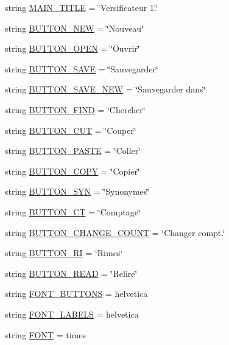 \begin{DoxyCompactItemize}
\item 
string \hyperlink{namespacemainframe_a4d151f87ec600e83da16f6301c0207e3}{M\+A\+I\+N\+\_\+\+T\+I\+T\+L\+E} = \char`\"{}Versificateur 1.\char`\"{}
\item 
string \hyperlink{namespacemainframe_ae4415cd1bd468aab3cb32677fa90a17e}{B\+U\+T\+T\+O\+N\+\_\+\+N\+E\+W} = \char`\"{}Nouveau\char`\"{}
\item 
string \hyperlink{namespacemainframe_a11d78a613c6ebc37d61aa0949a288686}{B\+U\+T\+T\+O\+N\+\_\+\+O\+P\+E\+N} = \char`\"{}Ouvrir\char`\"{}
\item 
string \hyperlink{namespacemainframe_ad0a9c1147be7794e1babbb45c99f4cf5}{B\+U\+T\+T\+O\+N\+\_\+\+S\+A\+V\+E} = \char`\"{}Sauvegarder\char`\"{}
\item 
string \hyperlink{namespacemainframe_a4650b84570a1374524f0b5fc37ca15c9}{B\+U\+T\+T\+O\+N\+\_\+\+S\+A\+V\+E\+\_\+\+N\+E\+W} = \char`\"{}Sauvegarder dans\char`\"{}
\item 
string \hyperlink{namespacemainframe_a0ee34ea1859c695536f5519610b4bac2}{B\+U\+T\+T\+O\+N\+\_\+\+F\+I\+N\+D} = \char`\"{}Chercher\char`\"{}
\item 
string \hyperlink{namespacemainframe_aca439e8911986f6bf15170e358d7c69a}{B\+U\+T\+T\+O\+N\+\_\+\+C\+U\+T} = \char`\"{}Couper\char`\"{}
\item 
string \hyperlink{namespacemainframe_a00380c1a1b21364ba7a90aa3869215b5}{B\+U\+T\+T\+O\+N\+\_\+\+P\+A\+S\+T\+E} = \char`\"{}Coller\char`\"{}
\item 
string \hyperlink{namespacemainframe_a176b68c15c69fa4b7dc161350ee421e4}{B\+U\+T\+T\+O\+N\+\_\+\+C\+O\+P\+Y} = \char`\"{}Copier\char`\"{}
\item 
string \hyperlink{namespacemainframe_ade1a54555c9cf39f3f23692edf8995ae}{B\+U\+T\+T\+O\+N\+\_\+\+S\+Y\+N} = \char`\"{}Synonymes\char`\"{}
\item 
string \hyperlink{namespacemainframe_a5819a70500ef6ef239e7ab58a21b8558}{B\+U\+T\+T\+O\+N\+\_\+\+C\+T} = \char`\"{}Comptage\char`\"{}
\item 
string \hyperlink{namespacemainframe_aaedd3bab1a6fdbf293f4f84b258396ca}{B\+U\+T\+T\+O\+N\+\_\+\+C\+H\+A\+N\+G\+E\+\_\+\+C\+O\+U\+N\+T} = \char`\"{}Changer compt.\char`\"{}
\item 
string \hyperlink{namespacemainframe_a1245d15496e22d7e584dfc5519082b6e}{B\+U\+T\+T\+O\+N\+\_\+\+R\+I} = \char`\"{}Rimes\char`\"{}
\item 
string \hyperlink{namespacemainframe_a1b771399895d0939a086acd3e3795389}{B\+U\+T\+T\+O\+N\+\_\+\+R\+E\+A\+D} = \char`\"{}Relire\char`\"{}
\item 
string \hyperlink{namespacemainframe_a06aedc2b7ca974cea0d0ba091f72e813}{F\+O\+N\+T\+\_\+\+B\+U\+T\+T\+O\+N\+S} = \textquotesingle{}helvetica\textquotesingle{}
\item 
string \hyperlink{namespacemainframe_acfc1a2e7db046b191dd8b784c4314f3b}{F\+O\+N\+T\+\_\+\+L\+A\+B\+E\+L\+S} = \textquotesingle{}helvetica\textquotesingle{}
\item 
string \hyperlink{namespacemainframe_a23e006e8b339f73b0a6905fac5b37603}{F\+O\+N\+T} = \textquotesingle{}times\textquotesingle{}
\end{DoxyCompactItemize}


